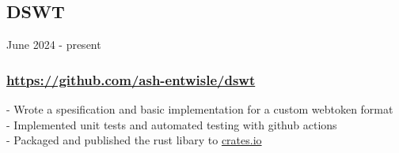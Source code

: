 \subsection{DSWT} June 2024 - present \\
\subsubsection{\href{https://github.com/ash-entwisle/dswt}{https://github.com/ash-entwisle/dswt} }
-\:  Wrote a spesification and basic implementation for a custom webtoken format \\
-\:  Implemented unit tests and automated testing with github actions \\
-\:  Packaged and published the rust libary to \href{https://crates.io/}{crates.io} \\ 
